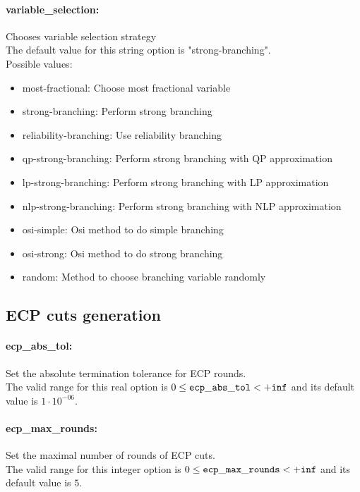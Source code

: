 \paragraph{variable\_selection:}\label{opt:variable_selection} Chooses variable selection strategy \\
 The default value for this string option is "strong-branching".
\\ 
Possible values:
\begin{itemize}
   \item most-fractional: Choose most fractional variable
   \item strong-branching: Perform strong branching
   \item reliability-branching: Use reliability branching
   \item qp-strong-branching: Perform strong branching with QP approximation
   \item lp-strong-branching: Perform strong branching with LP approximation
   \item nlp-strong-branching: Perform strong branching with NLP approximation
   \item osi-simple: Osi method to do simple branching
   \item osi-strong: Osi method to do strong branching
   \item random: Method to choose branching variable randomly
\end{itemize}

\subsection{ECP cuts generation}
\label{sec:ECPcutsgeneration}
\paragraph{ecp\_abs\_tol:}\label{opt:ecp_abs_tol} Set the absolute termination tolerance for ECP rounds. \\
 The valid range for this real option is 
$0 \le {\tt ecp\_abs\_tol } <  {\tt +inf}$
and its default value is $1 \cdot 10^{-06}$.


\paragraph{ecp\_max\_rounds:}\label{opt:ecp_max_rounds} Set the maximal number of rounds of ECP cuts. \\
 The valid range for this integer option is
$0 \le {\tt ecp\_max\_rounds } <  {\tt +inf}$
and its default value is $5$.


